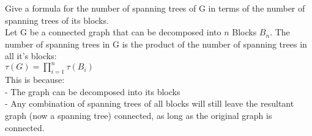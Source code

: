 \documentclass[12pt]{article}
\newenvironment{question}[2][Question]{\begin{trivlist}
\item[\hskip \labelsep {\bfseries #1}\hskip \labelsep {\bfseries #2.}]}{\end{trivlist}}
\begin{document}
\begin{question}{5}
	Give a formula for the number of spanning trees of G in terms of the number of spanning trees of its blocks.	\\
	Let G be a connected graph that can be decomposed into $n$ Blocks $B_n$. The number of spanning trees in G is the product of the number of spanning trees in all it's blocks: \\

	$\tau(G) = \prod_{i=1}^{n}\tau(B_i)$\\
	This is because:\\
	- The graph can be decomposed into its blocks\\
	- Any combination of spanning trees of all blocks will still leave the resultant graph (now a spanning tree) connected, as long as the original graph is connected.
\end{question}
\end{document}
